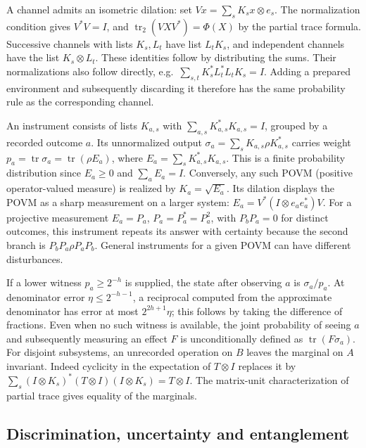 A channel admits an isometric dilation: set
\(Vx=\sum_s K_sx\otimes e_s\). The normalization condition gives
\(V^*V=I\), and \(\operatorname{tr}_2(VXV^*)=\Phi(X)\) by the partial
trace formula. Successive channels with lists \(K_s,L_t\) have list
\(L_tK_s\), and independent channels have the list \(K_s\otimes L_t\).
These identities follow by distributing the sums. Their normalizations
also follow directly, e.g.\ \(\sum_{s,t}K_s^*L_t^*L_tK_s=I\).
Adding a prepared environment and subsequently discarding it therefore
has the same probability rule as the corresponding channel.

An instrument consists of lists \(K_{a,s}\) with
\(\sum_{a,s}K_{a,s}^*K_{a,s}=I\), grouped by a recorded outcome \(a\).
Its unnormalized output
\(\sigma_a=\sum_s K_{a,s}\rho K_{a,s}^*\) carries weight
\(p_a=\operatorname{tr}\sigma_a
=\operatorname{tr}(\rho E_a)\),
where \(E_a=\sum_s K_{a,s}^*K_{a,s}\). This is a finite probability
distribution since \(E_a\ge0\) and \(\sum_a E_a=I\).
Conversely, any such POVM (positive operator-valued measure) is realized
by \(K_a=\sqrt{E_a}\). Its dilation displays the POVM as a sharp
measurement on a larger system: \(E_a=V^*(I\otimes e_a e_a^*)V\).
For a projective measurement \(E_a=P_a\), \(P_a=P_a^*=P_a^2\),
with \(P_bP_a=0\) for distinct outcomes, this instrument repeats its
answer with certainty because the second branch is
\(P_bP_a\rho P_aP_b\). General instruments for a given POVM can have
different disturbances.

If a lower witness \(p_a\ge 2^{-h}\) is supplied, the state after
observing \(a\) is \(\sigma_a/p_a\). At denominator error
\(\eta\le2^{-h-1}\), a reciprocal computed from the approximate
denominator has error at most \(2^{2h+1}\eta\); this follows by taking
the difference of fractions. Even when no such witness is available,
the joint probability of seeing \(a\) and subsequently measuring an
effect \(F\) is unconditionally defined as
\(\operatorname{tr}(F\sigma_a)\).
For disjoint subsystems, an unrecorded operation on \(B\) leaves the
marginal on \(A\) invariant. Indeed cyclicity in the expectation of
\(T\otimes I\) replaces it by
\(\sum_s (I\otimes K_s)^*(T\otimes I)(I\otimes K_s)
=T\otimes I\). The matrix-unit characterization of partial trace gives
equality of the marginals.

\subsection{Discrimination, uncertainty and entanglement}

